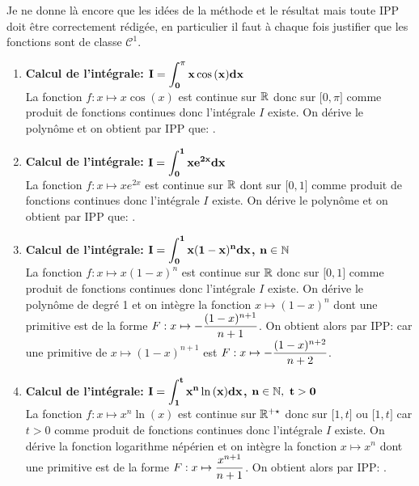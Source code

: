 \documentclass[a4paper, 11pt,reqno]{article}
\begin{document}
\begin{correction}  \;
	\noindent Je ne donne l\`{a} encore que les id\'ees de la m\'ethode et le r\'esultat mais toute IPP doit \^{e}tre correctement r\'edig\'ee, en particulier il faut \`a chaque fois justifier que les fonctions sont de classe $\mathcal{C}^1$.
	\begin{enumerate}
		\item \textbf{Calcul de l'int\'egrale: $\mathbf{\displaystyle I=\int_{0}^{\pi} x\cos{(x)} dx}$}\\
		      \noindent  La fonction $f: x\mapsto x\cos{(x)}$ est continue sur $\mathbb{R}$ donc sur $\lbrack 0,\pi\rbrack$ comme produit de fonctions continues donc l'int\'egrale $I$ existe. On d\'erive le polyn\^{o}me et on obtient par IPP que: .
		\item \textbf{Calcul de l'int\'egrale: $\mathbf{\displaystyle I= \int_{0}^{1} xe^{2x} dx }$}\\
		      \noindent La fonction $f: x\mapsto xe^{2x}$ est continue sur $\mathbb{R}$ dont sur $\lbrack 0,1\rbrack$ comme produit de fonctions continues donc l'int\'egrale $I$ existe. On d\'erive le polyn\^{o}me et on obtient par IPP que: .
		\item \textbf{Calcul de l'int\'egrale: $\mathbf{\displaystyle I=\int_{0}^{1} x(1-x)^n dx}$, $\mathbf{n\in\mathbb{N}}$}\\
		      \noindent La fonction $f: x\mapsto  x(1-x)^n$ est continue sur $\mathbb{R}$ donc sur $\lbrack 0,1\rbrack$ comme produit de fonctions continues donc l'int\'egrale $I$ existe. On d\'erive le polyn\^{o}me de degr\'e 1 et on int\`{e}gre la fonction $x\mapsto (1-x)^n$ dont une primitive est de la forme $F: x\mapsto -\displaystyle\frac{(1-x)^{n+1}}{n+1}$. On obtient alors par IPP:  car une primitive de $x\mapsto (1-x)^{n+1}$ est $F: x\mapsto -\displaystyle\frac{(1-x)^{n+2}}{n+2}$.
		\item \textbf{Calcul de l'int\'egrale: $\mathbf{\displaystyle I= \int_{1}^{t} x^n \ln{(x)} dx} $, $\mathbf{n\in\N,\ t>0}$}\\
		      \noindent La fonction $f: x\mapsto  x^n \ln{(x)}$ est continue sur $\mathbb{R}^{+\star}$ donc sur $\lbrack 1,t\rbrack$ ou $\lbrack 1,t\rbrack$ car $t>0$ comme produit de fonctions continues donc l'int\'egrale $I$ existe. On d\'erive la fonction logarithme n\'ep\'erien et on int\`{e}gre la fonction $x\mapsto x^n$ dont une primitive est de la forme $F: x\mapsto \displaystyle\frac{x^{n+1}}{n+1}$. On obtient alors par IPP: .
	\end{enumerate}
\end{correction}
\end{document}
